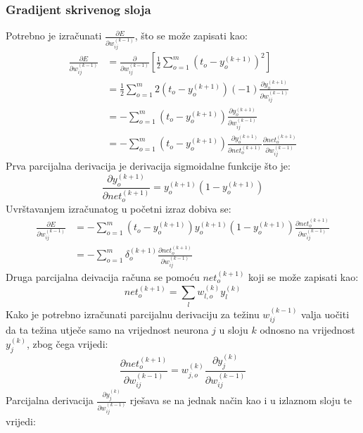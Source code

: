 \documentclass[times, utf8, zavrsni, numeric]{fer}
\begin{document}
\subsubsection{Gradijent skrivenog sloja}
Potrebno je izračunati $\frac{\partial E}{\partial w_{ij}^{(k-1)}}$, što se može zapisati kao:
\begin{equation*}
\begin{split}
    \frac{\partial E}{\partial w_{ij}^{(k-1)}}
        & = \frac{\partial}{\partial w_{ij}^{(k-1)}} 
        \left[\frac{1}{2}\displaystyle\sum_{o = 1}^m(t_o - y_o^{(k + 1)})^2\right]\\
        & = \frac{1}{2} \displaystyle\sum_{o = 1}^m2(t_o - y_o^{(k + 1)})(-1) \frac{\partial y_o^{(k + 1)}}{\partial w_{ij}^{(k-1)}} \\
        & = -\displaystyle\sum_{o = 1}^m(t_o - y_o^{(k + 1)})\frac{\partial y_o^{(k + 1)}}{\partial w_{ij}^{(k-1)}}\\
        & = -\displaystyle\sum_{o = 1}^m(t_o - y_o^{(k + 1)})\frac{\partial y_o^{(k + 1)}}{\partial net_{o}^{(k+1)}}\frac{\partial net_o^{(k + 1)}}{\partial w_{ij}^{(k-1)}}
\end{split}
\end{equation*}
Prva parcijalna derivacija je derivacija sigmoidalne funkcije što je:
\[
    \frac{\partial y_o^{(k + 1)}}{\partial net_{o}^{(k+1)}}
    = y_o^{(k + 1)} (1 - y_o^{(k + 1)})
\]
Uvrštavanjem izračunatog u početni izraz dobiva se:
\begin{equation*}
\begin{split}
    \frac{\partial E}{\partial w_{ij}^{(k-1)}}
        & = -\displaystyle\sum_{o = 1}^m(t_o - y_o^{(k + 1)})y_o^{(k + 1)} (1 - y_o^{(k + 1)})\frac{\partial net_o^{(k + 1)}}{\partial w_{ij}^{(k-1)}}\\
        & = -\displaystyle\sum_{o = 1}^m\delta_o^{(k+1)}\frac{\partial net_o^{(k + 1)}}{\partial w_{ij}^{(k-1)}}
\end{split}
\end{equation*}
Druga parcijalna deivacija računa se pomoću $net_o^{(k + 1)}$ koji se može zapisati kao:
\[
    net_o^{(k + 1)} = \displaystyle\sum_l w_{l,o}^{(k)}y_l^{(k)}
\]
Kako je potrebno izračunati parcijalnu derivaciju za težinu $w_{ij}^{(k-1)}$ valja uočiti da ta težina utječe samo na vrijednost neurona $j$ u sloju $k$ odnosno na vrijednost $y_j^{(k)}$, zbog čega vrijedi:
\[
    \frac{\partial net_o^{(k + 1)}}{\partial w_{ij}^{(k-1)}}
    = w_{j,o}^{(k)}\frac{\partial y_j^{(k)}}{\partial w_{ij}^{(k-1)}}
\]
Parcijalna derivacija $\frac{\partial y_j^{(k)}}{\partial w_{ij}^{(k-1)}}$ rješava se na jednak način kao i u izlaznom sloju te vrijedi:
\end{document}
